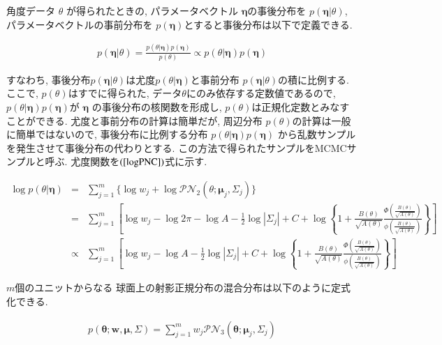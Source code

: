 \documentclass[a4j,11pt]{jarticle}
\begin{document}
角度データ $\theta$ が得られたときの, パラメータベクトル $\bm \eta$の事後分布を $p(\bm \eta| \theta)$, パラメータベクトルの事前分布を $p(\bm \eta)$とすると事後分布は以下で定義できる. 

\vspace{-1zh}
\begin{eqnarray*}
p(\bm \eta | \theta) = \frac{p(\theta | \bm \eta) p(\bm \eta)}{p(\theta)} \propto p(\theta | \bm \eta) p(\bm \eta)
\end{eqnarray*}

\vspace{-0.5zh}
\noindent
すなわち, 事後分布$p(\bm \eta | \theta)$は尤度$p(\theta | \bm \eta)$と事前分布 $p(\bm \eta| \theta)$の積に比例する. ここで, $p(\theta)$はすでに得られた, データ$\theta$にのみ依存する定数値であるので, $p(\theta | \bm \eta) p(\bm \eta)$が $\bm \eta$ の事後分布の核関数を形成し, $p(\theta)$は正規化定数とみなすことができる. 尤度と事前分布の計算は簡単だが, 周辺分布 $p(\theta)$の計算は一般に簡単ではないので, 事後分布に比例する分布 $p(\theta | \bm \eta) p(\bm \eta)$ から乱数サンプルを発生させて事後分布の代わりとする. この方法で得られたサンプルをMCMCサンプルと呼ぶ. 尤度関数を$(\ref{logPNC})$式に示す. 

\vspace{-2zh}
\begin{eqnarray}
\label{logPNC}
\log p(\theta | \bm \eta) &=& \sum^m_{j=1} \{\log w_j + \log \mathcal{PN}_2(\theta;\bm \mu_j, \Sigma_j)\} \nonumber \\ 
&=& \sum^m_{j=1} \left[ \log w_j - \log 2\pi - \log A - \frac{1}{2} \log |\Sigma_j| + C + \log \left\{1 + \frac{B(\theta)}{\sqrt{A(\theta)}} \frac{\Phi \left(\frac{B(\theta)}{\sqrt{A(\theta)}}\right)}{\phi \left(\frac{B(\theta)}{\sqrt{A(\theta)}}\right)}\right\} \right] \nonumber \\
&\propto& \sum^m_{j=1} \left[ \log w_j - \log A - \frac{1}{2} \log |\Sigma_j| + C + \log \left\{1 + \frac{B(\theta)}{\sqrt{A(\theta)}} \frac{\Phi \left(\frac{B(\theta)}{\sqrt{A(\theta)}}\right)}{\phi \left(\frac{B(\theta)}{\sqrt{A(\theta)}}\right)}\right\} \right]  
\end{eqnarray}

$m$個のユニットからなる 球面上の射影正規分布の混合分布は以下のように定式化できる. 

\vspace{-2zh}
\begin{eqnarray*}
p(\bm \theta;\bm w,\bm \mu, \Sigma) = \sum^m_{j=1} w_j \mathcal{PN}_3(\bm \theta;\bm \mu_j, \Sigma_j) 
\end{eqnarray*}
\end{document}
